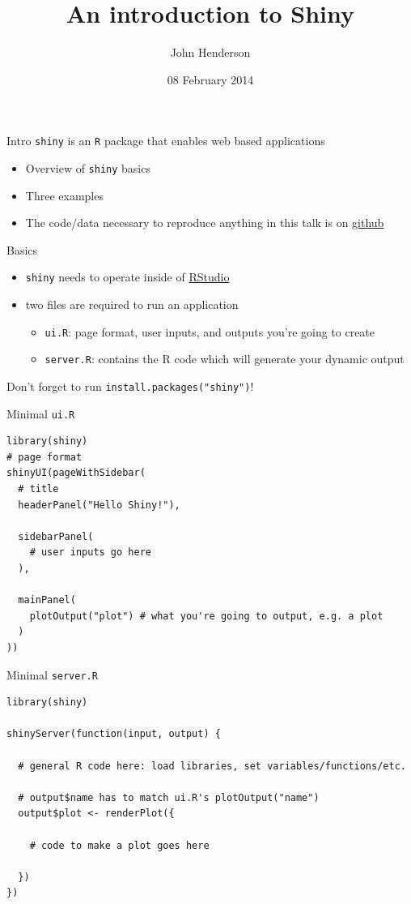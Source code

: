 \documentclass[sans,aspectratio=169,presentation,bigger,fleqn]{beamer}
\author{John Henderson}
\date{08 February 2014}
\title{An introduction to Shiny}
\begin{document}
\maketitle

\begin{frame}[fragile,label=sec-1]{Intro}
 \texttt{shiny} is an \texttt{R} package that enables web based applications
\begin{itemize}
\item Overview of \texttt{shiny} basics
\item Three examples
\item The code/data necessary to reproduce anything in this talk is on \href{https://github.com/jwhendy/devFest-shiny}{github}
\end{itemize}
\end{frame}
\begin{frame}[fragile,label=sec-2]{Basics}
 \begin{itemize}
\item \texttt{shiny} needs to operate inside of \href{http://www.rstudio.com/}{RStudio}
\item\relax [At least] two files are required to run an application
\begin{itemize}
\item \texttt{ui.R}: page format, user inputs, and outputs you're going to create
\item \texttt{server.R}: contains the R code which will generate your dynamic output
\end{itemize}
\end{itemize}

\vspace{0.5cm}

Don't forget to run \texttt{install.packages("shiny")}!
\end{frame}
\begin{frame}[fragile,label=sec-3]{Minimal \texttt{ui.R}}
 \scriptsize
\begin{verbatim}
library(shiny)
# page format
shinyUI(pageWithSidebar(
  # title
  headerPanel("Hello Shiny!"),

  sidebarPanel(
    # user inputs go here
  ),

  mainPanel(
    plotOutput("plot") # what you're going to output, e.g. a plot
  )
))
\end{verbatim}
\scriptsize
\end{frame}
\begin{frame}[fragile,label=sec-4]{Minimal \texttt{server.R}}
 \scriptsize
\begin{verbatim}
library(shiny)

shinyServer(function(input, output) {

  # general R code here: load libraries, set variables/functions/etc.

  # output$name has to match ui.R's plotOutput("name")
  output$plot <- renderPlot({

    # code to make a plot goes here

  })
})
\end{verbatim}
\scriptsize
\end{frame}
\end{document}
